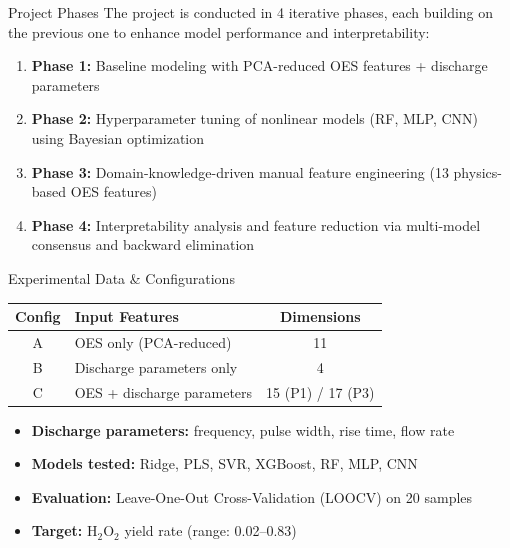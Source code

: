 \documentclass{libs/XJTLU_format}
\begin{document}
\begin{frame}{Project Phases}
    The project is conducted in 4 iterative phases, each building on the previous one to enhance model performance and interpretability:
    \begin{enumerate}
        \item \textbf{Phase 1:} Baseline modeling with PCA-reduced OES features + discharge parameters
        \item \textbf{Phase 2:} Hyperparameter tuning of nonlinear models (RF, MLP, CNN) using Bayesian optimization
        \item \textbf{Phase 3:} Domain-knowledge-driven manual feature engineering (13 physics-based OES features)
        \item \textbf{Phase 4:} Interpretability analysis and feature reduction via multi-model consensus and backward elimination
    \end{enumerate}
\end{frame}

\begin{frame}{Experimental Data \& Configurations}
    \begin{table}[h]
        \centering
        \small
        \begin{tabular}{@{}clc@{}}
            \toprule
            \textbf{Config} & \textbf{Input Features} & \textbf{Dimensions} \\
            \midrule
            A & OES only (PCA-reduced) & 11 \\
            B & Discharge parameters only & 4 \\
            C & OES + discharge parameters & 15 (P1) / 17 (P3) \\
            \bottomrule
        \end{tabular}
    \end{table}
    \vspace{0.3em}
    \begin{itemize}
        \item \textbf{Discharge parameters:} frequency, pulse width, rise time, flow rate
        \item \textbf{Models tested:} Ridge, PLS, SVR, XGBoost, RF, MLP, CNN
        \item \textbf{Evaluation:} Leave-One-Out Cross-Validation (LOOCV) on 20 samples
        \item \textbf{Target:} H$_2$O$_2$ yield rate (range: 0.02--0.83)
    \end{itemize}
\end{frame}
\end{document}
